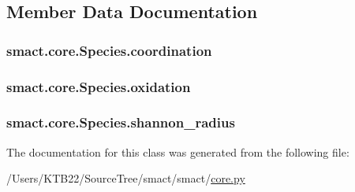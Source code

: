 \subsection{Member Data Documentation}
\hypertarget{classsmact_1_1core_1_1_species_a4e9691114a02162516af95d4974f1541}{}
\subsubsection[{coordination}]{\setlength{\rightskip}{0pt plus 5cm}smact.\+core.\+Species.\+coordination}\label{classsmact_1_1core_1_1_species_a4e9691114a02162516af95d4974f1541}
\hypertarget{classsmact_1_1core_1_1_species_aa7e923db8eba011ccd5cbf7da36707ec}{}
\subsubsection[{oxidation}]{\setlength{\rightskip}{0pt plus 5cm}smact.\+core.\+Species.\+oxidation}\label{classsmact_1_1core_1_1_species_aa7e923db8eba011ccd5cbf7da36707ec}
\hypertarget{classsmact_1_1core_1_1_species_a4b07462f361429921475d57e057cdd2b}{}
\subsubsection[{shannon\+\_\+radius}]{\setlength{\rightskip}{0pt plus 5cm}smact.\+core.\+Species.\+shannon\+\_\+radius}\label{classsmact_1_1core_1_1_species_a4b07462f361429921475d57e057cdd2b}


The documentation for this class was generated from the following file\+:\begin{DoxyCompactItemize}
\item 
/\+Users/\+K\+T\+B22/\+Source\+Tree/smact/smact/\hyperlink{core_8py}{core.\+py}\end{DoxyCompactItemize}
